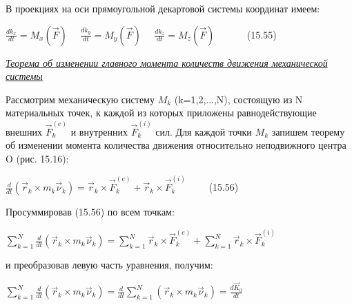 {\begin{center}
    \par В проекциях на оси прямоугольной декартовой системы координат имеем:
    
    \par $\frac{d{k}_x}{dt}={M}_x(\vec{F})\quad$
    $\frac{d{k}_y}{dt}={M}_y(\vec{F})\quad$
    $\frac{d{k}_z}{dt}={M}_z(\vec{F})\quad\qquad$ (15.55)

    \par \textit {\underline{Теорема об изменении главного момента количеств  движения механической системы}}
    
    \par Рассмотрим механическую систему $M_k$ (k=1,2,...,N), состоящую из N материальных  точек,  к  каждой  из  которых  приложены  равнодействующие внешних $\vec{F}_k^{(e)}$ и внутренних $\vec{F}_k^{(i)}$ сил. Для каждой точки $M_k$ запишем теорему об  изменении  момента  количества  движения  относительно  неподвижного центра O (рис. 15.16):
    
    \par $\frac{d}{dt}(\vec{r}_{k}\times m_k\vec{\nu}_k)=\vec{r}_{k}\times \vec{F}_k^{(e)}+\vec{r}_{k}\times \vec{F}_k^{(i)}\qquad$ (15.56)

    \par Просуммировав (15.56) по всем точкам:

    \par $\sum\limits_{k=1}^N\frac{d}{dt}(\vec{r}_{k}\times m_k\vec{\nu}_k)=\sum\limits_{k=1}^N\vec{r}_{k}\times \vec{F}_k^{(e)}+\sum\limits_{k=1}^N\vec{r}_{k}\times \vec{F}_k^{(i)}\qquad$

    \par и преобразовав левую часть уравнения, получим:

    \par $\sum\limits_{k=1}^N\frac{d}{dt}(\vec{r}_{k}\times m_k\vec{\nu}_k) = \frac{d}{dt}\sum\limits_{k=1}^N(\vec{r}_{k}\times m_k\vec{\nu}_k)=\frac{d\vec{K}_0}{dt}$
    

\end{center}}
